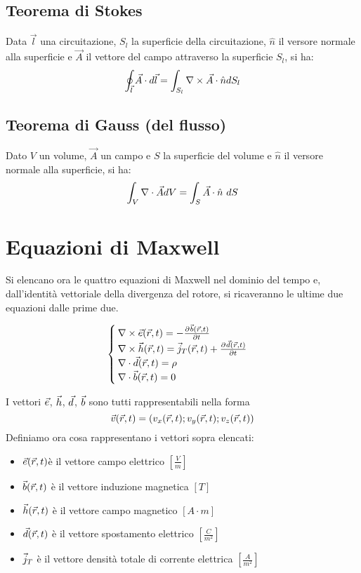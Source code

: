\subsection{Teorema di Stokes}
Data $\vec{l}$ una circuitazione, $S_l$ la superficie della circuitazione, $\hat{n}$ il versore normale alla superficie  e $\vec{A}$ il vettore del campo attraverso la superficie $S_l$, si ha:
\begin{equation}
  \oint_{\vec{l}} \vec{A} \cdot d\vec{l} = \int_{S_l}\nabla\times \vec{A} \cdot \hat{n} d S_l
\end{equation}

\subsection{Teorema di Gauss (del flusso)}
Dato $V$ un volume, $\vec{A}$ un campo e $S$ la superficie del volume e $\hat{n}$
il versore normale alla superficie, si ha:
\begin{equation}
  \int_V \nabla\cdot \vec{A} dV = \int_S \vec{A}\cdot \hat{n} ~ dS
\end{equation}

\section{Equazioni di Maxwell}
Si elencano ora le quattro equazioni di Maxwell nel dominio del tempo e, dall'identità
vettoriale della divergenza del rotore, si ricaveranno le ultime due equazioni dalle prime due.

\begin{equation}\begin{cases}
  \nabla\times \vec{e}(\vec{r},t) = -\frac{\partial^{} {\vec{b}(\vec{r},t)}}{\partial {t}^{}} \\
  \nabla\times \vec{h}(\vec{r},t) = \vec{j}_T(\vec{r},t) + \frac{\partial^{} {\vec{d}(\vec{r},t)}}{\partial {t}^{}} \\
  \nabla\cdot \vec{d}(\vec{r},t) = \rho \\
  \nabla\cdot \vec{b}(\vec{r},t) = 0
\end{cases}\label{eq:maxwell}\end{equation}

I vettori $\vec{e}$, $\vec{h}$, $\vec{d}$, $\vec{b}$ sono tutti rappresentabili nella forma
$$\vec{v}(\vec{r},t) = \left(v_x(\vec{r},t);v_y(\vec{r},t);v_z(\vec{r},t)\right)$$
Definiamo ora cosa rappresentano i vettori sopra elencati:
\begin{itemize}
  \item \textbf{$\vec{e}(\vec{r},t)$}è il vettore campo elettrico $\left[\frac{V}{m}\right]$
  \item \textbf{$\vec{b}(\vec{r},t)$} è il vettore induzione magnetica $[T]$
  \item \textbf{$\vec{h}(\vec{r},t)$} è il vettore campo magnetico $[A \cdot m]$
  \item \textbf{$\vec{d}(\vec{r},t)$} è il vettore spostamento elettrico $\left[\frac{C}{m^2}\right]$
  \item \textbf{$\vec{j}_T$} è il vettore densità totale di corrente elettrica $\left[\frac{A}{m^2}\right]$
\end{itemize}

